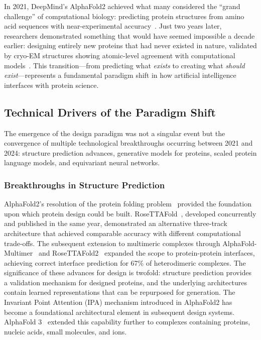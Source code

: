 In 2021, DeepMind's AlphaFold2 achieved what many considered the ``grand challenge'' of computational biology: predicting protein structures from amino acid sequences with near-experimental accuracy~\citep{jumper2021alphafold}. Just two years later, researchers demonstrated something that would have seemed impossible a decade earlier: designing entirely new proteins that had never existed in nature, validated by cryo-EM structures showing atomic-level agreement with computational models~\citep{watson2023rfdiffusion}. This transition---from predicting what \textit{exists} to creating what \textit{should exist}---represents a fundamental paradigm shift in how artificial intelligence interfaces with protein science.

\subsection{Technical Drivers of the Paradigm Shift}
\label{subsec:drivers}

The emergence of the design paradigm was not a singular event but the convergence of multiple technological breakthroughs occurring between 2021 and 2024: structure prediction advances, generative models for proteins, scaled protein language models, and equivariant neural networks.

\subsubsection{Breakthroughs in Structure Prediction}

AlphaFold2's resolution of the protein folding problem~\citep{jumper2021alphafold} provided the foundation upon which protein design could be built. RoseTTAFold~\citep{baek2021rosettafold}, developed concurrently and published in the same year, demonstrated an alternative three-track architecture that achieved comparable accuracy with different computational trade-offs. The subsequent extension to multimeric complexes through AlphaFold-Multimer~\citep{evans2022alphafoldmultimer} and RoseTTAFold2~\citep{baek2023rosettafold2} expanded the scope to protein-protein interfaces, achieving correct interface prediction for 67\% of heterodimeric complexes. The significance of these advances for design is twofold: structure prediction provides a validation mechanism for designed proteins, and the underlying architectures contain learned representations that can be repurposed for generation. The Invariant Point Attention (IPA) mechanism introduced in AlphaFold2 has become a foundational architectural element in subsequent design systems. AlphaFold 3~\citep{abramson2024alphafold3} extended this capability further to complexes containing proteins, nucleic acids, small molecules, and ions.


